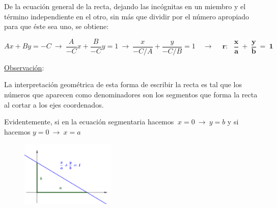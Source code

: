 \vspace{5mm}
\begin{definition}
	
	De la ecuación general de la recta, dejando las incógnitas en un miembro y el término independiente en el otro, sin más que dividir por el número apropiado para que éste sea uno, se obtiene:
	
	$$Ax+By=-C \ \to \ \frac A{-C}x+\frac{B}{-C}y=1 \ \to \ \frac{x}{-C/A}+\frac{y}{-C/B}=1 \quad \to \quad \boxed{ \ \boldsymbol{ r:\  \ \ \dfrac x a \ + \ \dfrac y b \ = \ 1 } \ } $$	
\end{definition}

\vspace{5mm}
\begin{multicols}{2}
\underline{Observación}: 

La interpretación geométrica de esta forma de escribir la recta es tal que los números que aparecen como denominadores son los segmentos que forma la recta al cortar a los ejes coordenados. 

\vspace{1mm} \begin{footnotesize}Evidentemente, si en la ecuación segmentaria hacemos $\ x=0 \ \to \ y=b$ y si hacemos $y=0 \ \to \ x=a$ \end{footnotesize} \QED

\begin{figure}[H]
	\centering
	\includegraphics[width=0.4\textwidth]{img-ga/ga14.png}
\end{figure}
\end{multicols}

